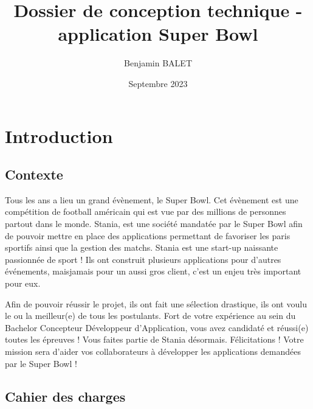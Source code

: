 \documentclass{book}
\title{Dossier de conception technique - application Super Bowl}
\author{Benjamin BALET}
\date{Septembre 2023}
\begin{document}
\maketitle{}
\tableofcontents
\newpage

\chapter{Introduction}

\section{Contexte}

Tous les ans a lieu un grand évènement, le Super Bowl. Cet évènement est une compétition de football américain
 qui est vue par des millions de personnes partout dans le monde. Stania, est une société mandatée par le 
 Super Bowl afin de pouvoir mettre en place des applications permettant de favoriser les paris sportifs ainsi 
 que la gestion des matchs. Stania est une start-up naissante passionnée de sport ! Ils ont construit plusieurs 
 applications pour d'autres événements, maisjamais pour un aussi gros client, c'est un enjeu très important pour eux.

Afin de pouvoir réussir le projet, ils ont fait une sélection drastique, ils ont voulu le ou la meilleur(e) 
de tous les postulants. Fort de votre expérience au sein du Bachelor Concepteur Développeur d'Application, 
vous avez candidaté et réussi(e) toutes les épreuves ! Vous faites partie de Stania désormais. Félicitations !
 Votre mission sera d'aider vos collaborateurs à développer les applications demandées par le Super Bowl !

\section{Cahier des charges}
\end{document}
